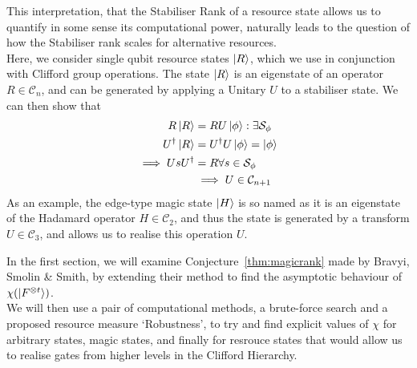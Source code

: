 \documentclass{standalone}
\begin{document}
This interpretation, that the Stabiliser Rank of a resource state allows us to quantify in some sense its computational power, naturally leads to the question of how the Stabiliser rank scales for alternative resources. \\
Here, we consider single qubit resource states $\ket{R}$, which we use in conjunction with Clifford group operations. The state $\ket{R}$ is an eigenstate of an operator $R\in\mathcal{C}_{n}$, and can be generated by applying a Unitary $U$ to a stabiliser state. We can then show that
\begin{align}
\begin{split}
R\ket{R} &= R U\ket{\phi} : \exists \mathcal{S}_{\phi} \\
U^{\dagger}\ket{R} &= U^{\dagger}U\ket{\phi} = \ket{\phi}\\
\implies UsU^{\dagger} &= R \forall s\in\mathcal{S}_{\phi}\\
&\implies U \in\mathcal{C}_{n+1} \\
\end{split}
\end{align}
As an example, the edge-type magic state $\ket{H}$ is so named as it is an eigenstate of the Hadamard operator $H\in\mathcal{C}_{2}$, and thus the state is generated by a transform $U\in\mathcal{C}_{3}$, and allows us to realise this operation $U$.
\par
In the first section, we will examine Conjecture~\ref{thm:magicrank} made by Bravyi, Smolin \& Smith, by extending their method to find the asymptotic behaviour of $\chi(\ket{F^{\otimes t}})$. \\
We will then use a pair of computational methods, a brute-force search and a proposed resource measure `Robustness', to try and find explicit values of $\chi$ for arbitrary states, magic states, and finally for resrouce states that would allow us to realise gates from higher levels in the Clifford Hierarchy.
\end{document}
